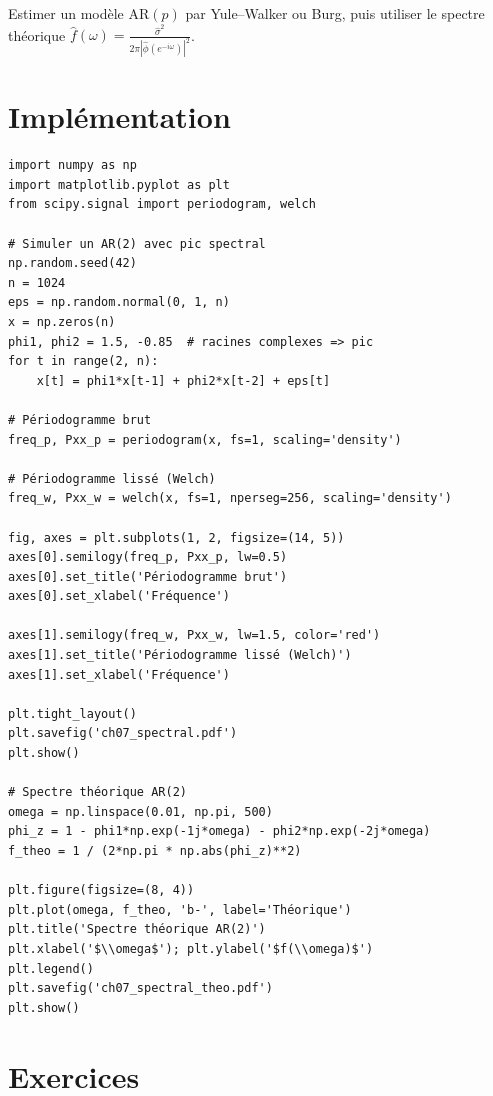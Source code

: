 Estimer un mod\`ele AR$(p)$ par Yule--Walker ou Burg, puis utiliser le spectre th\'eorique $\hat{f}(\omega)=\frac{\hat\sigma^2}{2\pi|\hat\phi(e^{-i\omega})|^2}$.

\section{Impl\'ementation}

\begin{codeblock}[title=\textbf{Python}]
\begin{verbatim}
import numpy as np
import matplotlib.pyplot as plt
from scipy.signal import periodogram, welch

# Simuler un AR(2) avec pic spectral
np.random.seed(42)
n = 1024
eps = np.random.normal(0, 1, n)
x = np.zeros(n)
phi1, phi2 = 1.5, -0.85  # racines complexes => pic
for t in range(2, n):
    x[t] = phi1*x[t-1] + phi2*x[t-2] + eps[t]

# Périodogramme brut
freq_p, Pxx_p = periodogram(x, fs=1, scaling='density')

# Périodogramme lissé (Welch)
freq_w, Pxx_w = welch(x, fs=1, nperseg=256, scaling='density')

fig, axes = plt.subplots(1, 2, figsize=(14, 5))
axes[0].semilogy(freq_p, Pxx_p, lw=0.5)
axes[0].set_title('Périodogramme brut')
axes[0].set_xlabel('Fréquence')

axes[1].semilogy(freq_w, Pxx_w, lw=1.5, color='red')
axes[1].set_title('Périodogramme lissé (Welch)')
axes[1].set_xlabel('Fréquence')

plt.tight_layout()
plt.savefig('ch07_spectral.pdf')
plt.show()

# Spectre théorique AR(2)
omega = np.linspace(0.01, np.pi, 500)
phi_z = 1 - phi1*np.exp(-1j*omega) - phi2*np.exp(-2j*omega)
f_theo = 1 / (2*np.pi * np.abs(phi_z)**2)

plt.figure(figsize=(8, 4))
plt.plot(omega, f_theo, 'b-', label='Théorique')
plt.title('Spectre théorique AR(2)')
plt.xlabel('$\\omega$'); plt.ylabel('$f(\\omega)$')
plt.legend()
plt.savefig('ch07_spectral_theo.pdf')
plt.show()
\end{verbatim}
\end{codeblock}

\section{Exercices}

